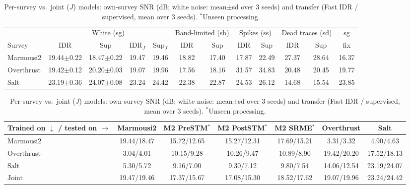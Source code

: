 \begin{table}[!t]
\centering
\caption{Per-survey vs.\ joint ($J$) models: own-survey SNR (dB; white noise: mean$\pm$sd over 3 seeds) and transfer (Fast IDR / supervised, mean over 3 seeds). $^\ast$Unseen processing.}
\label{tab:perdataset}
\begin{tabular}{lccccccccccc}
\toprule
& \multicolumn{4}{c}{White (sg)} & \multicolumn{2}{c}{Band-limited (sb)} & \multicolumn{2}{c}{Spikes (ss)} & \multicolumn{2}{c}{Dead traces (sd)} & sg \\
\cmidrule(lr){2-5}\cmidrule(lr){6-7}\cmidrule(lr){8-9}\cmidrule(lr){10-11}\cmidrule(lr){12-12}
Survey & IDR & Sup & IDR$_J$ & Sup$_J$ & IDR & Sup & IDR & Sup & IDR & Sup & fix \\
\midrule
Marmousi2 & 19.44$\pm$0.22 & 18.47$\pm$0.22 & 19.47 & 19.46 & 18.82 & 17.40 & 17.87 & 22.49 & 27.37 & 28.64 & 16.37 \\
Overthrust & 19.42$\pm$0.12 & 20.20$\pm$0.03 & 19.07 & 19.96 & 17.56 & 18.16 & 31.57 & 34.83 & 20.48 & 20.45 & 19.77 \\
Salt & 23.19$\pm$0.36 & 24.07$\pm$0.08 & 23.24 & 24.42 & 22.38 & 22.87 & 24.53 & 26.12 & 14.68 & 15.54 & 23.85 \\
\bottomrule
\end{tabular}

\vspace{4pt}
\begin{tabular}{lcccccc}
\toprule
Trained on $\downarrow$ / tested on $\rightarrow$ & Marmousi2 & M2 PreSTM$^\ast$ & M2 PostSTM$^\ast$ & M2 SRME$^\ast$ & Overthrust & Salt \\
\midrule
Marmousi2 & 19.44/18.47 & 15.72/12.65 & 15.27/12.31 & 17.69/15.21 & 3.31/3.32 & 4.90/4.63 \\
Overthrust & 3.04/4.01 & 10.15/9.28 & 10.26/9.47 & 10.89/8.90 & 19.42/20.20 & 17.52/18.13 \\
Salt & 5.30/5.72 & 9.16/7.00 & 9.30/7.12 & 9.80/7.54 & 14.06/12.54 & 23.19/24.07 \\
Joint & 19.47/19.46 & 17.37/15.67 & 17.08/15.30 & 18.52/17.62 & 19.07/19.96 & 23.24/24.42 \\
\bottomrule
\end{tabular}
\end{table}
